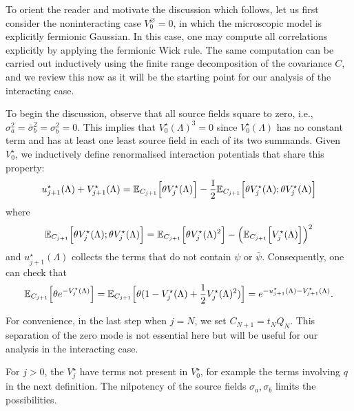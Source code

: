 \documentclass[11pt]{amsart}
\numberwithin{equation}{section}
\numberwithin{theorem}{section}
\newcommand{\1}{{\bf 1}}
\newcommand{\obs}{\star}
\newcommand{\Vbulk}{V^\varnothing}
\newcommand{\Vobs}{V^\obs}
\begin{document}
To orient the reader and motivate the discussion which follows, let us
first consider the noninteracting case $\Vbulk_0=0$, in which the
microscopic model is explicitly fermionic Gaussian.  In this case, one
may compute all correlations explicitly by applying the fermionic Wick
rule.  The same computation can be carried out inductively using the
finite range decomposition of the covariance $C$, and we review this now
as it will be the starting point for our analysis of the interacting case.

To begin the discussion, observe that all source fields square
to zero, i.e., $\sigma_a^2 = \bar\sigma_{b}^{2} = \sigma_b^2 = 0$.
This implies that $\Vobs_0(\Lambda)^3=0$  since $\Vobs_{0}(\Lambda)$ has no constant
term and has at least one least source field in each of its two summands.
Given $\Vobs_{0}$, we inductively
define renormalised interaction potentials that share this property:
\begin{equation} \label{e:Vobspt}
u_{j+1}^{\obs}{(\Lambda)}+  \Vobs_{j+1}(\Lambda) \bydef
  \E_{C_{j+1}}\qB{\theta \Vobs_j(\Lambda)} - \frac12 \E_{C_{j+1}}\qB{\theta \Vobs_j(\Lambda); \theta \Vobs_j(\Lambda)}
\end{equation}
where
\begin{equation}
  \E_{C_{j+1}}\qB{\theta \Vobs_j(\Lambda); \theta \Vobs_j(\Lambda)}
  \bydef
  \E_{C_{j+1}}\qB{\theta \Vobs_j(\Lambda)^{2}}
  -
  \pB{\E_{C_{j+1}}\qB{ \Vobs_j(\Lambda)}}^{2}
\end{equation}
and $u_{j+1}^{\obs}{(\Lambda)}$ collects the terms that do not contain $\psi$ or $\bar\psi$. 
Consequently, one can check that
\begin{equation}
  \E_{C_{j+1}}\qB{\theta e^{-\Vobs_j(\Lambda)}}
  =
  \E_{C_{j+1}}\qB{\theta (1-\Vobs_j(\Lambda) + \frac12 \Vobs_j(\Lambda)^2)}
  = e^{-u_{j+1}^{\obs}{(\Lambda)}-\Vobs_{j+1}(\Lambda)}.
\end{equation}

For convenience, in the last step when $j=N$, we set $C_{N+1}=t_NQ_N$. 
This separation of the zero mode is not essential here but will be useful for our
analysis in the interacting case.

For $j>0$, the $\Vobs_j$ have 
terms not present in $\Vobs_{0}$, for example the terms involving
$q$ in the next definition.
The nilpotency of the source fields $\sigma_{a}, \sigma_{b}$ limits the possibilities.
\end{document}
